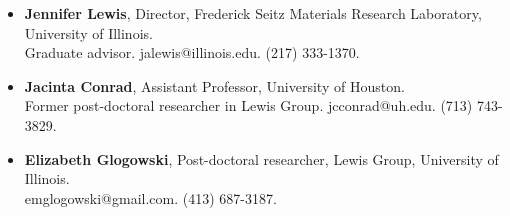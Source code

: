 \documentclass[10pt]{article}
\newcommand{\bigsection}[1]{	
	\vspace{4pt}
	{\fontfamily{phv}\selectfont\Large#1}

	\vspace{-10pt} \rule{\textwidth}{1pt}
}
\begin{document}
\vspace{-16pt}

\begin{itemize}\setlength{\itemsep}{0.25cm}
  \setlength{\parskip}{0cm}

\item \textbf{Jennifer Lewis}, Director, Frederick Seitz Materials Research Laboratory, University of Illinois.\\ Graduate advisor. jalewis@illinois.edu.  (217) 333-1370.
\item \textbf{Jacinta Conrad}, Assistant Professor, University of Houston.\\ Former post-doctoral researcher in Lewis Group. jcconrad@uh.edu. (713) 743-3829.
\item \textbf{Elizabeth Glogowski}, Post-doctoral researcher, Lewis Group, University of Illinois.\\ emglogowski@gmail.com. (413) 687-3187.

\end{itemize}


%
%
%
%
\end{document}

